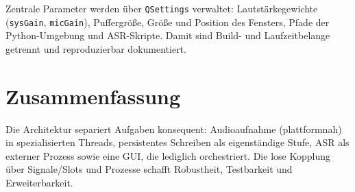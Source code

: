 Zentrale Parameter werden über \texttt{QSettings} verwaltet: Lautstärkegewichte (\texttt{sysGain}, \texttt{micGain}), Puffergröße, Größe und Position des Fensters, Pfade der Python-Umgebung und \ac{ASR}-Skripte. Damit sind Build- und Laufzeitbelange getrennt und reproduzierbar dokumentiert.



\section{Zusammenfassung}
Die Architektur separiert Aufgaben konsequent: Audioaufnahme (plattformnah) in
spezialisierten Threads, persistentes Schreiben als eigenständige Stufe, \ac{ASR} als externer Prozess sowie eine \ac{GUI}, die lediglich orchestriert. Die lose Kopplung über Signale/Slots und Prozesse schafft Robustheit, Testbarkeit und Erweiterbarkeit.
